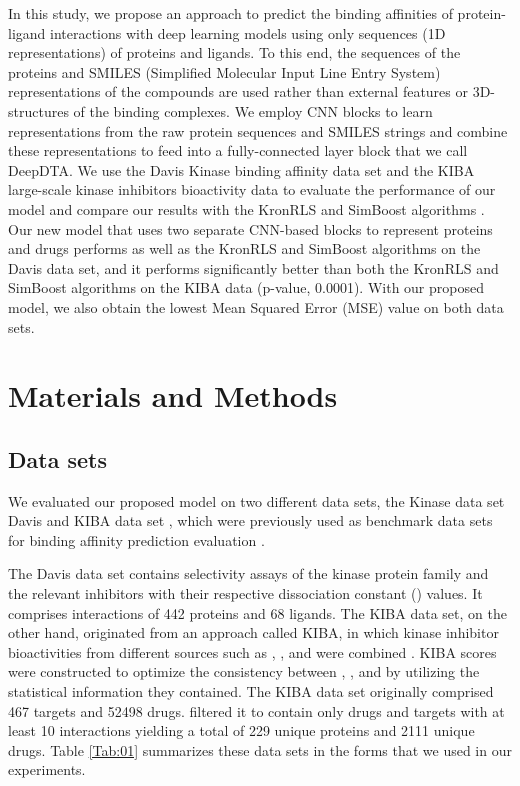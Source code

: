 \documentclass[11pt,letterpaper]{article}
\begin{document}
In this study, we propose an approach to predict the binding affinities of protein-ligand interactions with deep learning models using only  sequences (1D representations) of proteins and ligands. To this end, the sequences of the proteins and SMILES (Simplified Molecular Input Line Entry System) representations of the compounds are used rather than external features or 3D-structures of the binding complexes. We employ CNN blocks to learn representations from the raw protein sequences and SMILES strings and combine these representations to feed into a fully-connected layer block that we call DeepDTA. We use the Davis Kinase binding affinity data set \cite{davis2011comprehensive} and the KIBA large-scale kinase inhibitors bioactivity data \cite{tang2014making, he2017simboost} to evaluate the performance of our model and compare our results with  the KronRLS \cite{pahikkala2014toward} and SimBoost algorithms  \cite{he2017simboost}.  Our new model that uses two separate CNN-based blocks to represent proteins and drugs performs as well as the KronRLS  and SimBoost algorithms on the Davis data set, and  it performs significantly better than both the KronRLS and SimBoost algorithms  on the KIBA data (p-value, 0.0001).  With our proposed model, we also obtain the lowest Mean Squared Error (MSE) value on both data sets.



\section*{Materials and Methods}

\subsection*{Data sets}
We evaluated our proposed model on two different data sets, the Kinase data set Davis \cite{davis2011comprehensive}  and KIBA data set \cite{tang2014making}, which were previously used as benchmark data sets for binding affinity prediction evaluation \cite{pahikkala2014toward,he2017simboost}. 

The Davis data set contains selectivity assays of the kinase protein family and the relevant inhibitors with their respective dissociation constant () values. It comprises interactions of 442 proteins and 68 ligands. The KIBA data set, on the other hand, originated from an approach called KIBA, in which kinase inhibitor bioactivities from different sources such as , , and  were combined \cite{tang2014making}.  KIBA scores were constructed to optimize the consistency between , , and  by utilizing the statistical information they contained. The KIBA data set originally comprised 467 targets and 52498 drugs. \cite{he2017simboost}  filtered it to contain only drugs and targets with at least 10 interactions yielding  a total of 229 unique proteins and 2111 unique drugs. Table \ref{Tab:01} summarizes these data sets in the forms that we used in our experiments.
\end{document}

